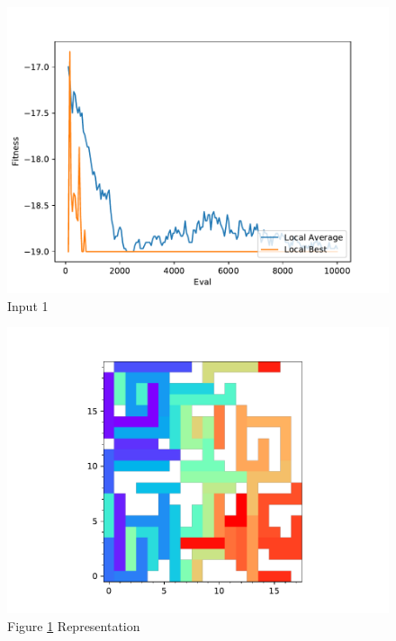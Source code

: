 \documentclass{standalone}
\begin{document}
\begin{figure}[!htb]
	\caption{Input 1}
	\label{fig:graph_1005}
	\includegraphics[width=\textwidth]{../graphs/graphs/1005.pdf}
\end{figure}


\begin{figure}[!htb]
	\caption{Figure \ref{fig:graph_1005} Representation}
	\label{fig:picture_1005}
	\includegraphics[width=\textwidth]{../graphs/picture/1005.pdf}
\end{figure}
\end{document}
